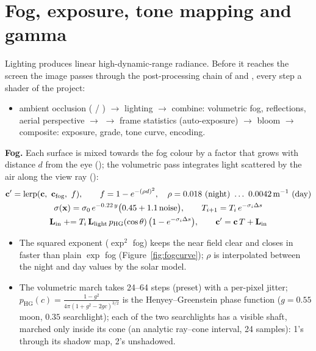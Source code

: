 \section{Fog, exposure, tone mapping and gamma}
\label{sec:post}
Lighting produces linear high-dynamic-range radiance. Before it reaches the screen the image passes through the
post-processing chain of  and , every step a shader of the project:
\begin{itemize}
\item ambient occlusion ( / ) $\to$ lighting $\to$ combine: volumetric fog, reflections, aerial perspective $\to$ 
$\to$ frame statistics (auto-exposure) $\to$ bloom $\to$ composite: exposure, grade, tone curve,  encoding.
\end{itemize}

\textbf{Fog.} Each surface is mixed towards the fog colour by a factor that grows with distance $d$ from the eye
(); the volumetric pass integrates light scattered by the air along the view ray
():
\begin{gather}
\vect c'=\operatorname{lerp}(\vect c,\ \vect c_{\text{fog}},\ f),\qquad f=1-e^{-(\rho d)^2},\quad \rho=0.018\ \text{(night)}\ \ldots\ 0.0042\,\text{m}^{-1}\ \text{(day)}\label{eq:fog}\\
\sigma(\vect x)=\sigma_0\,e^{-0.22\,y}\big(0.45+1.1\,\text{noise}\big),\qquad T_{i+1}=T_i\,e^{-\sigma_i\Delta s}\nonumber\\
\vect L_{\text{in}}\mathrel{+}=T_i\,\vect L_{\text{light}}\,p_{\text{HG}}(\cos\theta)\,\big(1-e^{-\sigma_i\Delta s}\big),\qquad
\vect c'=\vect c\,T+\vect L_{\text{in}}\nonumber
\end{gather}
\begin{itemize}
\item The squared exponent ($\exp^2$ fog) keeps the near field clear and closes in faster than plain $\exp$ fog
(Figure~\ref{fig:fogcurve}); $\rho$ is interpolated between the night and day values by the solar model.
\item The volumetric march takes 24--64 steps (preset) with a per-pixel jitter; $p_{\text{HG}}(c)=\frac{1-g^2}{4\pi(1+g^2-2gc)^{3/2}}$
is the Henyey--Greenstein phase function ($g=0.55$ moon, $0.35$ searchlight); each of the two searchlights has a visible shaft,
marched only inside its cone (an analytic ray--cone interval, 24 samples):  1's through its shadow map,  2's
unshadowed.
\end{itemize}

